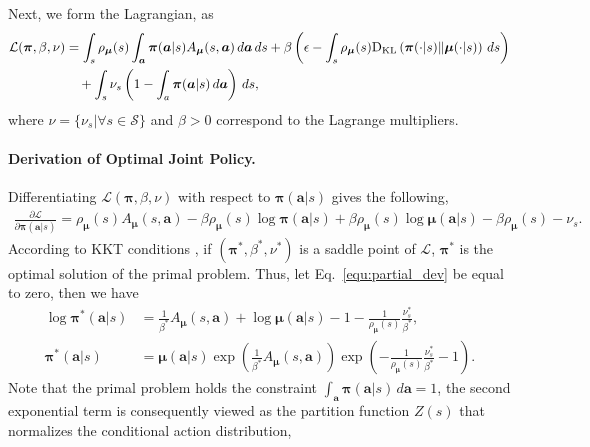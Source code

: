 \documentclass[11pt]{article}
\theoremstyle{plain}
\theoremstyle{remark}
\begin{document}
Next, we form the Lagrangian, as
\begin{align*}
    \mathcal{L}(\boldsymbol{\pi}, \beta, \nu) &= \int_{s}\rho_{\boldsymbol{\mu}}(s) \int_{\boldsymbol{a}}\boldsymbol{\pi}(\boldsymbol{a}|s) A_{\boldsymbol{\mu}}(s, \boldsymbol{a})\,d\boldsymbol{a}\,ds + \beta \left( \epsilon - \int_{s} \rho_{\boldsymbol{\mu}}(s) {\rm D}_{\rm KL}\left(\boldsymbol{\pi}(\cdot|s) \| \boldsymbol{\mu}(\cdot|s)\right)\,ds \right) \\
    & \quad + \int_{s}\nu_s \left( 1 - \int_{a}\boldsymbol{\pi}(\boldsymbol{a}|s)\,d\boldsymbol{a} \right)\,ds,
\end{align*}
where $\nu = \{\nu_s | \forall s \in \mathcal{S} \}$ and $\beta > 0$ correspond to the Lagrange multipliers. 

\paragraph{Derivation of Optimal Joint Policy.} Differentiating $\mathcal{L}(\boldsymbol{\pi}, \beta, \nu)$ with respect to $\boldsymbol{\pi}(\boldsymbol{a}|s)$ gives the following, 
\begin{align}
    \frac{\partial \mathcal{L}}{\partial \boldsymbol{\pi}(\boldsymbol{a}|s)} = \rho_{\boldsymbol{\mu}}(s)A_{\boldsymbol{\mu}}(s, \boldsymbol{a}) - \beta \rho_{\boldsymbol{\mu}}(s) \log \boldsymbol{\pi}(\boldsymbol{a}|s) + \beta \rho_{\boldsymbol{\mu}}(s) \log \boldsymbol{\mu}(\boldsymbol{a}|s) - \beta \rho_{\boldsymbol{\mu}}(s) - \nu_s.
\label{equ:partial_dev}
\end{align}
According to KKT conditions \citep{kkt}, if $(\boldsymbol{\pi}^{*}, \beta^{*}, \nu^{*})$ is a saddle point of $\mathcal{L}$, $\boldsymbol{\pi}^{*}$ is the optimal solution of the primal problem. Thus, let Eq.~\eqref{equ:partial_dev} be equal to zero, then we have
\begin{align}
    \log \boldsymbol{\pi}^{*}(\boldsymbol{a}|s) &= \frac{1}{\beta^{*}}A_{\boldsymbol{\mu}}(s, \boldsymbol{a}) + \log \boldsymbol{\mu}(\boldsymbol{a}|s) - 1 - \frac{1}{\rho_{\boldsymbol{\mu}}(s)} \frac{\nu_s^{*}}{\beta^{*}}, \\
    \boldsymbol{\pi}^{*}(\boldsymbol{a}|s) &= \boldsymbol{\mu}(\boldsymbol{a}|s) \exp \left( \frac{1}{\beta^{*}}A_{\boldsymbol{\mu}}(s, \boldsymbol{a}) \right) \exp \left( - \frac{1}{\rho_{\boldsymbol{\mu}}(s)} \frac{\nu_s^{*}}{\beta^{*}} - 1 \right).
\end{align}
Note that the primal problem holds the constraint $\int_{\boldsymbol{a}}\boldsymbol{\pi}(\boldsymbol{a}|s)\,d\boldsymbol{a} = 1$, the second exponential term is consequently viewed as the partition function $Z(s)$ that normalizes the conditional action distribution, 
\end{document}
